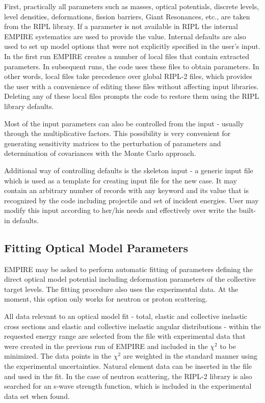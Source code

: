 \documentclass[twocolumn,amsmath,amssymb,10pt,groupedaddress,a4paper]{revtex4}
\begin{document}
First, practically all parameters such as masses, optical potentials, discrete levels, level densities, deformations, fission barriers, Giant Resonances, etc., are taken from the RIPL library. If a parameter is not available in RIPL the internal EMPIRE systematics are used to provide the value. Internal defaults are also used to set up model options that were not explicitly specified in the user's input. In the first run EMPIRE creates a number of local files that contain extracted parameters. In subsequent runs, the code uses these files to obtain parameters. In other words, local files take precedence over global RIPL-2 files, which provides the user with a convenience of editing these files without affecting input libraries. Deleting any of these local files prompts the code to restore them using the RIPL library defaults.

Most of the input parameters can also be controlled from the input - usually through the multiplicative factors. This possibility is very convenient for  generating sensitivity matrices to the perturbation of parameters and determination of covariances with the Monte Carlo approach.

Additional way of controlling defaults is the skeleton input - a generic input file which is used as a template for creating input file for the new case. It may contain an arbitrary number of records with any keyword and its value that is  recognized by the code including projectile and set of incident energies. User may modify this input according to her/his needs and effectively over write the built-in defaults.

\subsection{Fitting Optical Model Parameters}
EMPIRE may be asked to perform automatic fitting of parameters defining the direct optical model potential including  deformation parameters of the collective target levels. The fitting procedure also uses the experimental data. At the moment, this option only works for neutron or proton scattering.

All data relevant to an optical model fit - total, elastic and collective inelastic cross sections and elastic and collective inelastic angular distributions - within the requested energy range are selected from the file with experimental data that were created in the previous run of EMPIRE and included in the $\chi^{2}$ to be minimized. The data points in the $\chi^{2}$ are weighted in the standard manner using the experimental uncertainties. Natural element data can be inserted in the file and used in the fit. In the case of neutron scattering, the RIPL-2 library is also searched for an s-wave strength function, which is included in the experimental data set when found.
\end{document}
